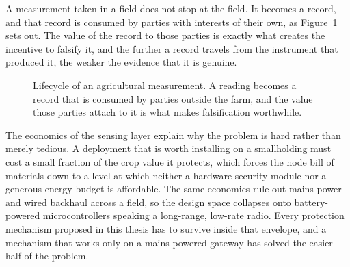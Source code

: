 \documentclass[12pt,a4paper,oneside]{book}
\begin{document}
A measurement taken in a field does not stop at the field. It becomes a record,
and that record is consumed by parties with interests of their own, as
Figure~\ref{fig:lifecycle} sets out. The value of the record to those parties
is exactly what creates the incentive to falsify it, and the further a record
travels from the instrument that produced it, the weaker the evidence that it
is genuine.

\begin{figure}[htbp]
  \centering
  \caption{Lifecycle of an agricultural measurement. A reading becomes a record
           that is consumed by parties outside the farm, and the value those
           parties attach to it is what makes falsification worthwhile.}
  \label{fig:lifecycle}
\end{figure}

The economics of the sensing layer explain why the problem is hard rather than
merely tedious. A deployment that is worth installing on a smallholding must
cost a small fraction of the crop value it protects, which forces the node bill
of materials down to a level at which neither a hardware security module nor a
generous energy budget is affordable. The same economics rule out mains power
and wired backhaul across a field, so the design space collapses onto
battery-powered microcontrollers speaking a long-range, low-rate radio. Every
protection mechanism proposed in this thesis has to survive inside that
envelope, and a mechanism that works only on a mains-powered gateway has solved
the easier half of the problem.
\end{document}
